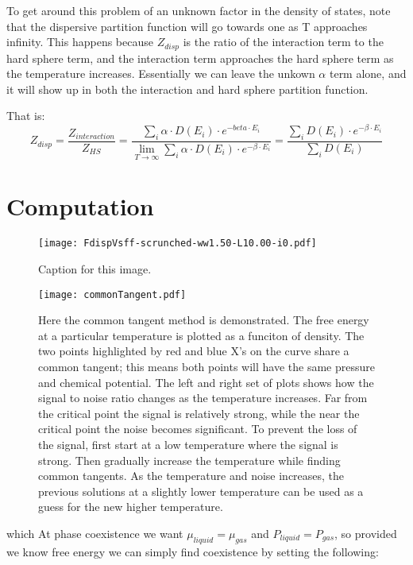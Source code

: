 To get around this problem of an unknown factor in the density of states, note that the dispersive partition function will go towards one as T approaches infinity. This happens because $Z_{disp}$ is the ratio of the interaction term to the hard sphere term, and the interaction term approaches the hard sphere term as the temperature increases. Essentially we can leave the unkown $\alpha$ term alone, and it will show up in both the interaction and hard sphere partition function.

That is: $$Z_{disp}=\frac{Z_{interaction}}{Z_{HS}}=\frac{\sum_i \alpha\cdot D(E_i)\cdot e^{-beta\cdot E_i}}{\lim_{T\to\infty}\sum_i \alpha\cdot D(E_i)\cdot e^{-\beta\cdot E_i}}=\frac{\sum_i D(E_i)\cdot e^{-\beta\cdot E_i}}{\sum_i D(E_i)}$$
\newpage
\section{Computation}
\begin{figure}[h]
\vspace*{-7mm}
\hspace*{-6mm}
	\centering
	\texttt{[image: FdispVsff-scrunched-ww1.50-L10.00-i0.pdf]}
	\caption{Caption for this image.}
	\label{fig:FdispVsff}
\end{figure}

\begin{figure}[h]
\vspace*{-7mm}
\hspace*{-6mm}
	\centering
	\texttt{[image: commonTangent.pdf]}
	\caption{\scriptsize Here the common tangent method is demonstrated. The free energy at a particular temperature is plotted as a funciton of density. The two points highlighted by red and blue X's on the curve share a common tangent; this means both points will have the same pressure and chemical potential. The left and right set of plots shows how the signal to noise ratio changes as the temperature increases. Far from the critical point the signal is relatively strong, while the near the critical point the noise becomes significant. To prevent the loss of the signal, first start at a low temperature where the signal is strong. Then gradually increase the temperature while finding common tangents. As the temperature and noise increases, the previous solutions at a slightly lower temperature can be used as a guess for the new higher temperature.}
	\label{fig:FdispVsff}
\end{figure}

which  At phase coexistence we want $\mu_{liquid}=\mu_{gas}$ and $P_{liquid}=P_{gas}$, so provided we know free energy we can simply find coexistence by setting the following:

